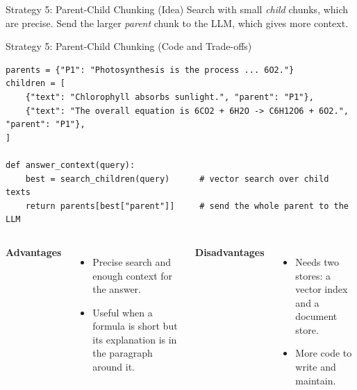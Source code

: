 \documentclass[aspectratio=169,10pt]{beamer}
\begin{document}
\begin{frame}[t]{Strategy 5: Parent-Child Chunking (Idea)}
\small
Search with small \emph{child} chunks, which are precise. Send the larger \emph{parent} chunk to the LLM, which gives more context.
\vspace{14pt}
\begin{center}
\end{center}
\end{frame}

\begin{frame}[t,fragile]{Strategy 5: Parent-Child Chunking (Code and Trade-offs)}
\small
\begin{lstlisting}
parents = {"P1": "Photosynthesis is the process ... 6O2."}
children = [
    {"text": "Chlorophyll absorbs sunlight.", "parent": "P1"},
    {"text": "The overall equation is 6CO2 + 6H2O -> C6H12O6 + 6O2.", "parent": "P1"},
]

def answer_context(query):
    best = search_children(query)      # vector search over child texts
    return parents[best["parent"]]     # send the whole parent to the LLM
\end{lstlisting}
\vspace{6pt}
\begin{columns}[T]
\textbf{Advantages}
\begin{itemize}
  \item Precise search and enough context for the answer.
  \item Useful when a formula is short but its explanation is in the paragraph around it.
\end{itemize}
\textbf{Disadvantages}
\begin{itemize}
  \item Needs two stores: a vector index and a document store.
  \item More code to write and maintain.
\end{itemize}
\end{columns}
\end{frame}
\end{document}
